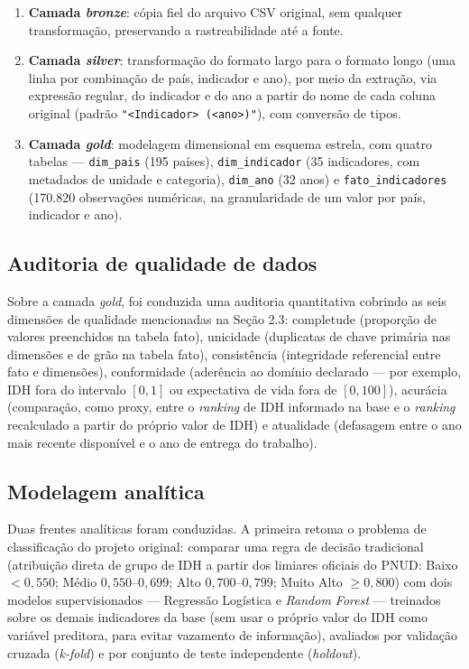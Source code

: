 \documentclass[11pt,a4paper]{article}
\begin{document}
\begin{enumerate}
\item \textbf{Camada \textit{bronze}}: cópia fiel do arquivo CSV original, sem qualquer transformação, preservando a rastreabilidade até a fonte.
\item \textbf{Camada \textit{silver}}: transformação do formato largo para o formato longo (uma linha por combinação de país, indicador e ano), por meio da extração, via expressão regular, do indicador e do ano a partir do nome de cada coluna original (padrão \texttt{"<Indicador> (<ano>)"}), com conversão de tipos.
\item \textbf{Camada \textit{gold}}: modelagem dimensional em esquema estrela, com quatro tabelas --- \texttt{dim\_pais} (195 países), \texttt{dim\_indicador} (35 indicadores, com metadados de unidade e categoria), \texttt{dim\_ano} (32 anos) e \texttt{fato\_indicadores} (170.820 observações numéricas, na granularidade de um valor por país, indicador e ano).
\end{enumerate}

\subsection{Auditoria de qualidade de dados}

Sobre a camada \textit{gold}, foi conduzida uma auditoria quantitativa cobrindo as seis dimensões de qualidade mencionadas na Seção 2.3: completude (proporção de valores preenchidos na tabela fato), unicidade (duplicatas de chave primária nas dimensões e de grão na tabela fato), consistência (integridade referencial entre fato e dimensões), conformidade (aderência ao domínio declarado --- por exemplo, IDH fora do intervalo $[0,1]$ ou expectativa de vida fora de $[0,100]$), acurácia (comparação, como proxy, entre o \textit{ranking} de IDH informado na base e o \textit{ranking} recalculado a partir do próprio valor de IDH) e atualidade (defasagem entre o ano mais recente disponível e o ano de entrega do trabalho).

\subsection{Modelagem analítica}

Duas frentes analíticas foram conduzidas. A primeira retoma o problema de classificação do projeto original: comparar uma regra de decisão tradicional (atribuição direta de grupo de IDH a partir dos limiares oficiais do PNUD: Baixo $<0,550$; Médio $0,550$--$0,699$; Alto $0,700$--$0,799$; Muito Alto $\geq 0,800$) com dois modelos supervisionados --- Regressão Logística e \textit{Random Forest} --- treinados sobre os demais indicadores da base (sem usar o próprio valor do IDH como variável preditora, para evitar vazamento de informação), avaliados por validação cruzada (\textit{k-fold}) e por conjunto de teste independente (\textit{holdout}).
\end{document}
